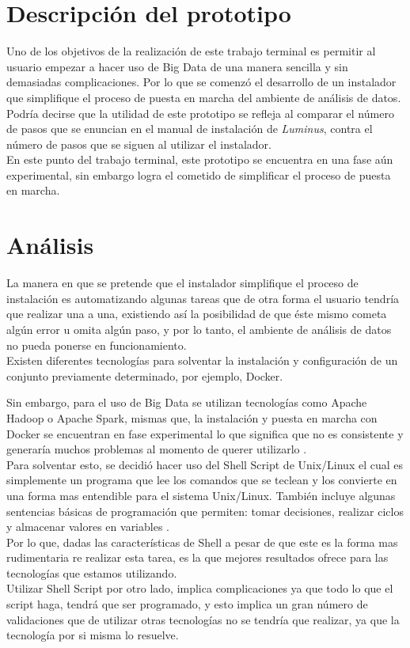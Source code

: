 \section{Descripción del prototipo}
Uno de los objetivos de la realización de este trabajo terminal es permitir al usuario empezar a hacer uso de Big Data de una manera sencilla y sin demasiadas complicaciones. Por lo que se comenzó el desarrollo de un instalador que simplifique el proceso de puesta en marcha del ambiente de análisis de datos.\\

Podría decirse que la utilidad de este prototipo se refleja al comparar el número de pasos que se enuncian en el manual de instalación de \emph{Luminus}, contra el número de pasos que se siguen al utilizar el instalador.\\

En este punto del trabajo terminal, este prototipo se encuentra en una fase aún experimental, sin embargo logra el 
cometido de simplificar el proceso de puesta en marcha.\\

\section{Análisis}
La manera en que se pretende que el instalador simplifique el proceso de instalación es automatizando algunas tareas que de otra forma el usuario tendría que realizar una a una, existiendo así la posibilidad de que éste mismo cometa algún error u omita algún paso, y por lo tanto, el ambiente de análisis de datos no pueda ponerse en funcionamiento.\\
Existen diferentes tecnologías para solventar la instalación y configuración de un conjunto previamente determinado, por ejemplo, Docker.

Sin embargo, para el uso de Big Data se utilizan tecnologías como Apache Hadoop o Apache Spark, mismas que, la instalación y puesta en marcha con Docker se encuentran en fase experimental lo que significa que no es consistente y generaría muchos problemas al momento de querer utilizarlo \cite{dockermalo}.   
\\
Para solventar esto, se decidió hacer uso del Shell Script de Unix/Linux el cual es simplemente un programa que lee los comandos que se teclean y los convierte en una forma mas entendible para el sistema Unix/Linux. También incluye algunas sentencias básicas de programación que permiten: tomar decisiones, realizar ciclos y almacenar valores en variables \cite{Baze}.
\\
Por lo que, dadas las características de Shell a pesar de que este es la forma mas rudimentaria re realizar esta tarea, es la que mejores resultados ofrece para las tecnologías que estamos utilizando.
\\
Utilizar Shell Script por otro lado, implica complicaciones ya que todo lo que el script haga, tendrá que ser programado, y esto implica un gran número de validaciones que de utilizar otras tecnologías no se tendría que realizar, ya que la tecnología por si misma lo resuelve.
